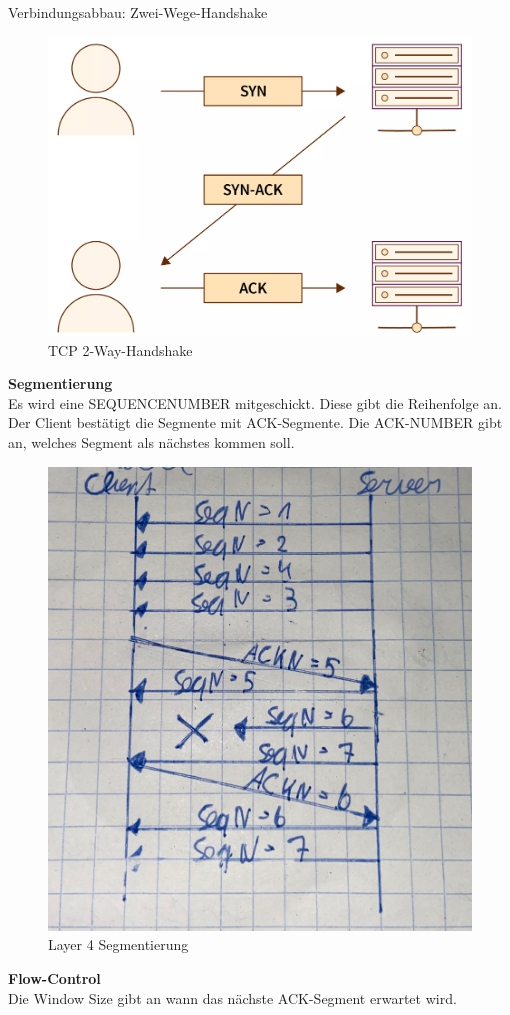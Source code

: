 Verbindungsabbau: Zwei-Wege-Handshake
\begin{figure}[H]
	\centering
	\includegraphics[width=0.8\linewidth]{figures/tcp_2wh.png}
	\caption{TCP 2-Way-Handshake}
\end{figure}

\textbf{Segmentierung} \\
Es wird eine SEQUENCENUMBER mitgeschickt. Diese gibt die Reihenfolge an. Der Client bestätigt die Segmente mit ACK-Segmente. Die ACK-NUMBER gibt an, welches Segment als nächstes kommen soll.
\begin{figure}[H]
	\centering
	\includegraphics[width=0.8\linewidth]{figures/l4_segment.jpeg}
	\caption{Layer 4 Segmentierung}
\end{figure}

\textbf{Flow-Control} \\
Die Window Size gibt an wann das nächste ACK-Segment erwartet wird.
